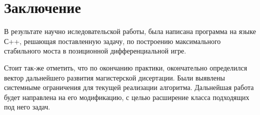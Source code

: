 \chapter{Заключение}

В результате научно иследовательской работы,
была написана программа на языке С++,
решающая поставленную задачу,
по построению максимального стабильного моста 
в позиционной дифференциальной игре.

Стоит так-же отметить, что по окончанию практики,
окончательно определился вектор дальнейшего развития 
магистерской дисертации. 
Были выявлены системныме ограничения
для текущей реализации алгоритма.
Дальнейшая работа будет направлена на его модификацию,
с целью расширение класса подходящих под него задач. 